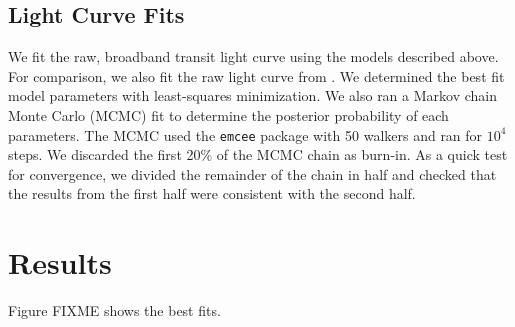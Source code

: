 \documentclass[twocolumn]{aastex62}
\begin{document}

\subsection{Light Curve Fits}
We fit the raw, broadband transit light curve using the models described above.  For comparison, we also fit the raw light curve from \cite{teachey18b}.  We determined the best fit model parameters with least-squares minimization.  We also ran a Markov chain Monte Carlo (MCMC) fit to determine the posterior probability of each parameters. The MCMC used the \texttt{emcee} package \citep{foremanmackey13} with 50 walkers and ran for $10^4$ steps. We discarded the first 20\% of the MCMC chain as burn-in. As a quick test for convergence, we divided the remainder of the chain in half and checked that the results from the first half were consistent with the second half.



\section{Results}
Figure FIXME shows the best fits.
\end{document}
